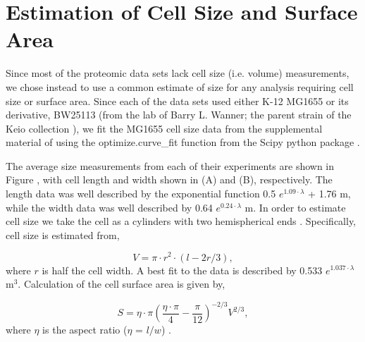 \section{Estimation of Cell Size and Surface Area}
\label{sec:protein_size_SV}
Since most of the proteomic data sets lack cell size (i.e. volume) measurements, we chose
instead to use a common estimate of size for any analysis requiring cell
size or surface area.  Since each of the data sets used either K-12 MG1655 or
its derivative, BW25113 (from the lab of Barry L. Wanner; the parent strain of
the Keio collection \citep{datsenko2000, baba2006}), we fit the MG1655 cell size
data from the supplemental material of \cite{si2017, si2019} using the optimize.curve\_fit function
from the Scipy python package \citep{2020scipynmeth}.

The average size measurements from each of their experiments are shown in Figure
, with  cell length and width shown in (A) and (B),
respectively. The length data was well described by the exponential function 0.5
$e^{1.09 \cdot \lambda}$ + 1.76 \textmu m, while the width data was well
described by 0.64 $e^{0.24 \cdot \lambda}$ \textmu m. In order to estimate cell
size we take the cell as a cylinders with two hemispherical ends \citep{si2017,
basan2015}. Specifically,  cell size  is estimated from,

\begin{equation}
V = \pi \cdot r^2 \cdot (l - 2r/3),
\label{eq:cell_size}
\end{equation}
where $r$ is half the cell width. A best fit to the data is described by 0.533
$e^{1.037 \cdot \lambda}$ \textmu m$^3$. Calculation of the cell surface area is
given by,

\begin{equation}
 S = \eta \cdot \pi (\frac{\eta \cdot \pi}{4} - \frac{\pi}{12})^{-2/3} V^{2/3},
 \label{eq:surface_area}
\end{equation}
where $\eta$ is the aspect ratio ($\eta$ = $l/w$) \citep{ojkic2019}.


